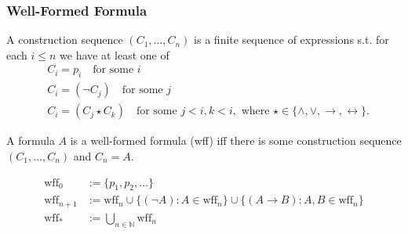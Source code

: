 \documentclass[UTF8,aspectratio=43,11pt,colorlinks,compress,openany]{beamer}%
\begin{document}
\begin{frame}\frametitle{Well-Formed Formula}
\setlength\abovedisplayskip{0pt}
\setlength\belowdisplayskip{0pt}
	\begin{definition}
		A construction sequence $(C_1,\dots, C_n)$ is a finite sequence of expressions s.t. for each $i\leq n$ we have at least one of 
		\begin{align*}
		&C_i=p_i\quad\text{for some $i$}\\
		&C_i=(\neg C_j)\quad\text{for some $j$}\\
		&C_i=(C_j\star C_k)\quad\text{for some $j<i, k<i$}, \mbox{ where }\star\in\{\wedge,\vee,\to,\leftrightarrow\}.
		\end{align*}
	\end{definition}
	\begin{definition}
	A formula $A$ is a well-formed formula (wff) iff there is some construction sequence $(C_1,\dots, C_n)$ and $C_n=A$.
	\end{definition}\vspace*{-3ex}
\begin{align*}
\mathrm{wff}_0&:=\{p_1,p_2,\dots\}\\
\mathrm{wff}_{n+1}&:=\mathrm{wff}_n\cup\big\{(\neg A): A\in\mathrm{wff}_n\big\}\cup\big\{(A\to B): A, B\in\mathrm{wff}_n\big\}\\
\mathrm{wff}_*&:=\bigcup\limits_{n\in\mathbb{N}}\mathrm{wff}_n
\end{align*}
\end{frame}
\end{document}
